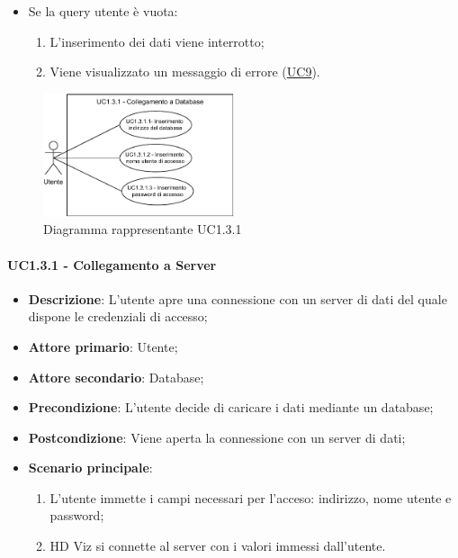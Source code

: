 \begin{itemize}
\begin{itemize}
        \item Se la query utente è vuota:
        \begin{enumerate}
            \item L'inserimento dei dati viene interrotto;
            \item Viene visualizzato un messaggio di errore (\hyperref[sub:uc9]{UC9}).
        \end{enumerate}
    \end{itemize}
\end{itemize}


\newpage
\begin{figure}[h]
    \centering
    \includegraphics[width=0.5\textwidth]{componenti/casi-duso/diagrammi/UC1_3_1.pdf}
    \caption{Diagramma rappresentante UC1.3.1}
    \label{fig:UC1.3}
\end{figure}


\paragraph{UC1.3.1 - Collegamento a Server}
\label{par:uc1.3.1}
\begin{itemize}
    \item \textbf{Descrizione}: L'utente apre una connessione con un server di dati del quale 
                                dispone le credenziali di accesso;

    \item \textbf{Attore primario}: Utente;
    \item \textbf{Attore secondario}: Database;
    
    \item \textbf{Precondizione}:   L'utente decide di caricare i dati mediante un database;
    \item \textbf{Postcondizione}:  Viene aperta la connessione con un server di dati;

	\item \textbf{Scenario principale}:
		\begin{enumerate}
			\item L'utente immette i campi necessari per l'acceso: indirizzo, nome utente e password;
			\item HD Viz si connette al server con i valori immessi dall'utente.
        \end{enumerate}
    \end{itemize}


